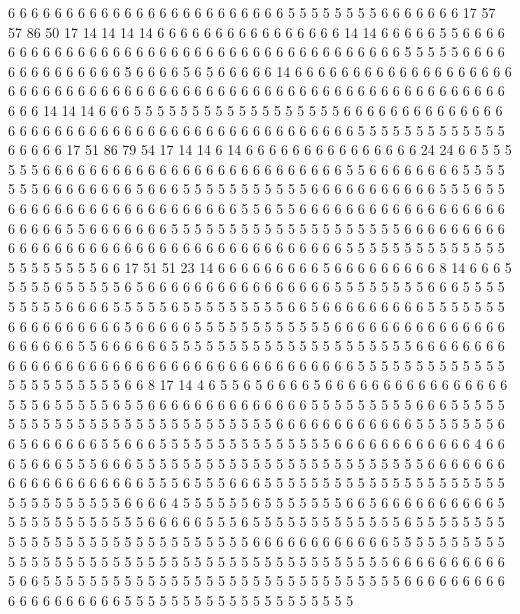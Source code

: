 6 6 6 6 6 6 6 6 6 6 6 6 6 6 6 6 6 6 6 6
6 6 6 6 5 5 5 5 5 5 5 5 6 6 6 6 6 6 6 17
57 57 86 50 17 14 14 14 14 6 6 6 6 6 6 6 6 6 6 6
6 6 6 6 6 14 14 6 6 6 6 6 5 5 6 6 6 6 6 6
6 6 6 6 6 6 6 6 6 6 6 6 6 6 6 6 6 6 6 6
6 6 6 6 6 6 6 6 6 6 6 6 5 5 5 5 5 6 6 6
6 6 6 6 6 6 6 6 6 6 6 5 6 6 6 6 5 6 5 6
6 6 6 6 14 6 6 6 6 6 6 6 6 6 6 6 6 6 6 6
6 6 6 6 6 6 6 6 6 6 6 6 6 6 6 6 6 6 6 6
6 6 6 6 6 6 6 6 6 6 6 6 6 6 6 6 6 6 6 6
6 6 6 6 6 6 6 6 6 6 14 14 14 6 6 6 5 5 5 5
5 5 5 5 5 5 5 5 5 5 5 5 5 5 6 6 6 6 6 6
6 6 6 6 6 6 6 6 6 6 6 6 6 6 6 6 6 6 6 6
6 6 6 6 6 6 6 6 6 6 6 6 6 6 6 6 6 6 5 5
5 5 5 5 5 5 5 5 5 5 5 6 6 6 6 6 17 51 86 79
54 17 14 14 6 14 6 6 6 6 6 6 6 6 6 6 6 6 6 6
6 24 24 6 6 5 5 5 5 5 5 6 6 6 6 6 6 6 6 6
6 6 6 6 6 6 6 6 6 6 6 6 6 6 6 6 6 5 5 6
6 6 6 6 6 6 6 5 5 5 5 5 5 5 6 6 6 6 6 6
6 6 5 6 6 6 5 5 5 5 5 5 5 5 5 5 5 6 6 6
6 6 6 6 6 6 6 6 5 5 5 6 5 5 6 6 6 6 6 6
6 6 6 6 6 6 6 6 6 6 6 6 6 6 5 5 6 5 5 6
6 6 6 6 6 6 6 6 6 6 6 6 6 6 6 6 6 6 6 6
6 6 5 5 6 6 6 6 6 6 6 5 5 5 5 5 5 5 5 5
5 5 5 5 5 5 5 5 5 5 5 6 6 6 6 6 6 6 6 6
6 6 6 6 6 6 6 6 6 6 6 6 6 6 6 6 6 6 6 6
6 6 6 6 6 6 6 6 6 5 5 5 5 5 5 5 5 5 5 5
5 5 5 5 5 5 5 5 5 5 5 6 6 17 51 51 23 14 6 6
6 6 6 6 6 6 6 5 6 6 6 6 6 6 6 6 6 8 14 6
6 6 5 5 5 5 5 6 5 5 5 5 5 6 5 6 6 6 6 6
6 6 6 6 6 6 6 6 6 6 6 5 5 5 5 5 5 5 5 6
6 6 5 5 5 5 5 5 5 5 5 6 6 6 6 5 5 5 5 5
6 5 5 5 5 5 5 5 5 5 6 6 5 6 6 6 6 6 6 6
6 6 5 5 5 5 5 5 5 6 6 6 6 6 6 6 6 6 6 5
6 6 6 6 6 5 5 5 5 5 5 5 5 5 5 5 5 6 6 6
6 6 6 6 6 6 6 6 6 6 6 6 6 6 6 6 6 6 5 5
6 6 6 6 6 6 5 5 5 5 5 5 5 5 5 5 5 5 5 5
5 5 5 5 5 5 5 6 6 6 6 6 6 6 6 6 6 6 6 6
6 6 6 6 6 6 6 6 6 6 6 6 6 6 6 6 6 6 6 6
6 6 6 6 6 5 5 5 5 5 5 5 5 5 5 5 5 5 5 5
5 5 5 5 5 5 5 5 6 6 8 17 14 4 6 5 5 6 5 6
6 6 6 5 6 6 6 6 6 6 6 6 6 6 6 6 6 6 6 6
5 5 5 6 5 5 5 5 5 6 5 5 6 6 6 6 6 6 6 6
6 6 6 6 6 6 5 5 5 5 5 5 5 5 5 6 6 6 5 5
5 5 5 5 5 5 5 5 5 5 5 5 5 5 5 5 5 5 5 5
5 5 5 5 5 5 6 6 6 6 6 6 6 6 6 6 6 6 5 5
5 5 5 5 5 6 6 5 6 6 6 6 6 6 5 5 6 6 6 5
5 5 5 5 5 5 5 5 5 5 5 5 5 5 6 6 6 6 6 6
6 6 6 6 6 6 4 6 6 6 5 6 6 6 5 5 5 6 6 6
5 5 5 5 5 5 5 5 5 5 5 5 5 5 5 5 5 5 5 5
5 5 5 5 5 6 6 6 6 6 6 6 6 6 6 6 6 6 6 6
6 6 6 6 5 5 5 6 5 5 5 6 6 6 5 5 5 5 5 5
5 5 5 5 5 5 5 5 5 5 5 5 5 5 5 5 5 5 5 5
5 5 5 5 5 6 6 6 6 4 5 5 5 5 5 5 6 5 5 5
5 5 5 5 6 6 5 6 6 6 6 6 6 6 6 6 6 5 5 5
5 5 5 5 5 5 5 5 5 5 6 6 6 6 6 5 5 5 6 5
5 5 5 5 5 5 5 5 5 5 5 5 6 5 5 5 5 5 5 5
5 5 5 5 5 5 5 5 5 5 5 5 5 5 5 5 5 5 5 5
5 5 6 6 6 6 6 6 6 6 6 6 6 6 5 5 5 5 5 5
5 5 5 5 5 5 5 5 5 5 5 5 5 5 5 5 5 5 5 5
5 5 5 5 5 5 5 5 5 5 5 5 5 5 5 5 5 6 6 6
6 6 6 6 6 6 6 5 6 6 5 5 5 5 5 5 5 5 5 5
5 5 5 5 5 5 5 5 5 5 5 5 5 5 5 5 5 5 5 5
5 6 6 6 6 6 6 6 6 6 6 6 6 6 6 6 6 6 6 6
5 5 5 5 5 5 5 5 5 5 5 5 5 5 5 5 5 5 5 5
